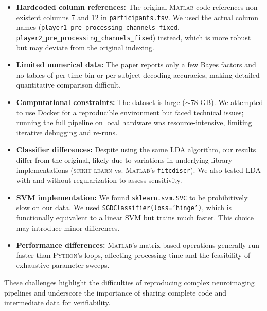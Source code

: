 \documentclass[11pt,a4paper]{article}
\newcommand{\matlab}{\textsc{Matlab}}
\newcommand{\python}{\textsc{Python}}
\newcommand{\sklearn}{\textsc{scikit-learn}}
\begin{document}
\begin{itemize}
    \item \textbf{Hardcoded column references:} The original \matlab{} code references non-existent columns 7 and 12 in \texttt{participants.tsv}. We used the actual column names (\texttt{player1\_pre\_processing\_\allowbreak channels\_fixed}, \texttt{player2\_pre\_processing\_\allowbreak channels\_fixed}) instead, which is more robust but may deviate from the original indexing.

    \item \textbf{Limited numerical data:} The paper reports only a few Bayes factors and no tables of per-time-bin or per-subject decoding accuracies, making detailed quantitative comparison difficult.

    \item \textbf{Computational constraints:} The dataset is large ($\sim$78 GB). We attempted to use Docker for a reproducible environment but faced technical issues; running the full pipeline on local hardware was resource-intensive, limiting iterative debugging and re-runs.

    \item \textbf{Classifier differences:} Despite using the same LDA algorithm, our results differ from the original, likely due to variations in underlying library implementations (\sklearn{} vs. \matlab{}'s \texttt{fitcdiscr}). We also tested LDA with and without regularization to assess sensitivity.

    \item \textbf{SVM implementation:} We found \texttt{sklearn.svm.SVC} to be prohibitively slow on our data. We used \texttt{SGDClassifier(loss='hinge')}, which is functionally equivalent to a linear SVM but trains much faster. This choice may introduce minor differences.

    \item \textbf{Performance differences:} \matlab{}'s matrix-based operations generally run faster than \python{}'s loops, affecting processing time and the feasibility of exhaustive parameter sweeps.
\end{itemize}

These challenges highlight the difficulties of reproducing complex neuroimaging pipelines and underscore the importance of sharing complete code and intermediate data for verifiability.

\end{document}
